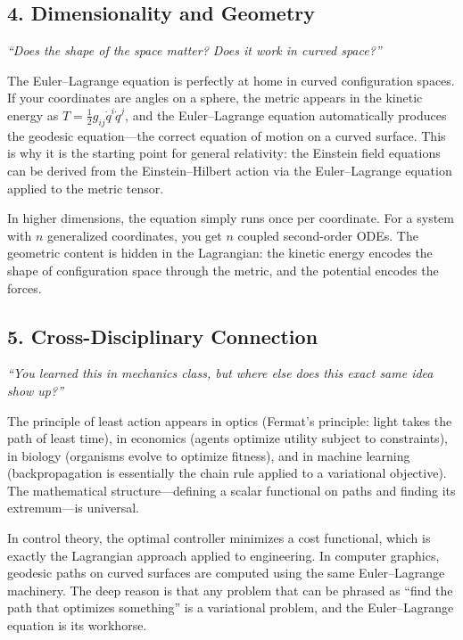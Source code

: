 \subsection*{4. Dimensionality and Geometry}
\textit{``Does the shape of the space matter? Does it work in curved space?''}

The Euler--Lagrange equation is perfectly at home in curved configuration spaces. If your coordinates are angles on a sphere, the metric appears in the kinetic energy as $T = \frac{1}{2}g_{ij}\dot{q}^i\dot{q}^j$, and the Euler--Lagrange equation automatically produces the geodesic equation---the correct equation of motion on a curved surface. This is why it is the starting point for general relativity: the Einstein field equations can be derived from the Einstein--Hilbert action via the Euler--Lagrange equation applied to the metric tensor.

In higher dimensions, the equation simply runs once per coordinate. For a system with $n$ generalized coordinates, you get $n$ coupled second-order ODEs. The geometric content is hidden in the Lagrangian: the kinetic energy encodes the shape of configuration space through the metric, and the potential encodes the forces.

\subsection*{5. Cross-Disciplinary Connection}
\textit{``You learned this in mechanics class, but where else does this exact same idea show up?''}

The principle of least action appears in optics (Fermat's principle: light takes the path of least time), in economics (agents optimize utility subject to constraints), in biology (organisms evolve to optimize fitness), and in machine learning (backpropagation is essentially the chain rule applied to a variational objective). The mathematical structure---defining a scalar functional on paths and finding its extremum---is universal.

In control theory, the optimal controller minimizes a cost functional, which is exactly the Lagrangian approach applied to engineering. In computer graphics, geodesic paths on curved surfaces are computed using the same Euler--Lagrange machinery. The deep reason is that any problem that can be phrased as ``find the path that optimizes something'' is a variational problem, and the Euler--Lagrange equation is its workhorse.

